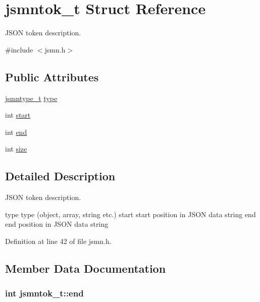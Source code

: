 \hypertarget{structjsmntok__t}{\section{jsmntok\-\_\-t Struct Reference}
\label{structjsmntok__t}
}


J\-S\-O\-N token description.  




{\ttfamily \#include $<$jsmn.\-h$>$}

\subsection*{Public Attributes}
\begin{DoxyCompactItemize}
\item 
\hyperlink{global__controller_2jsmn_8h_a065320719769f9dc1fbe30094e52802f}{jsmntype\-\_\-t} \hyperlink{structjsmntok__t_ac03dbd6b83cbcd979eb64702d5b9943e}{type}
\item 
int \hyperlink{structjsmntok__t_a0a8f55d0095f268ce8e224fe1234acd0}{start}
\item 
int \hyperlink{structjsmntok__t_ab49e0369f39e9b6174141e7f5bde5996}{end}
\item 
int \hyperlink{structjsmntok__t_a8ac3694b7335456c8e602197778883db}{size}
\end{DoxyCompactItemize}


\subsection{Detailed Description}
J\-S\-O\-N token description. 

type type (object, array, string etc.) start start position in J\-S\-O\-N data string end end position in J\-S\-O\-N data string 

Definition at line 42 of file jsmn.\-h.



\subsection{Member Data Documentation}
\hypertarget{structjsmntok__t_ab49e0369f39e9b6174141e7f5bde5996}{
\subsubsection[{end}]{\setlength{\rightskip}{0pt plus 5cm}int jsmntok\-\_\-t\-::end}}\label{structjsmntok__t_ab49e0369f39e9b6174141e7f5bde5996}



